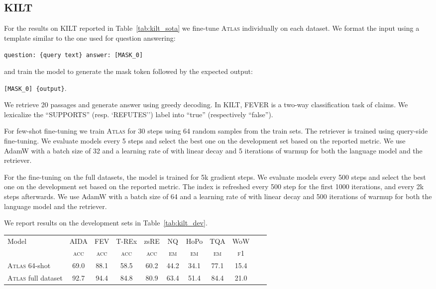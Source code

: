 \documentclass[10pt]{article} \usepackage[preprint]{tmlr}
\newcommand{\Atlas}{\textsc{Atlas}}
\begin{document}
\subsection{KILT}
\label{app:kilt}
For the results on KILT reported in Table~\ref{tab:kilt_sota} we fine-tune \Atlas{} individually on each dataset.
We format the input using a template similar to the one used for question answering:

\texttt{question: \{query text\} answer: [MASK\_0]}

and train the model to generate the mask token followed by the expected output:

\texttt{[MASK\_0] \{output\}}.

We retrieve 20 passages and generate answer using greedy decoding.
In KILT, FEVER is a two-way classification task of claims.
We lexicalize the ``SUPPORTS'' (resp. `REFUTES'') label into ``true'' (respectively ``false'').

For few-shot fine-tuning we train \Atlas{} for 30 steps using 64 random samples from the train sets.
The retriever is trained using query-side fine-tuning.
We evaluate models every 5 steps and select the best one on the development set based on the reported metric.
We use AdamW with a batch size of 32 and a learning rate of  with linear decay and 5 iterations of warmup for both the language model and the retriever.

For the fine-tuning on the full datasets, the model is trained for 5k gradient steps.
We evaluate models every 500 steps and select the best one on the development set based on the reported metric.
The index is refreshed every 500 step for the first 1000 iterations, and every 2k steps afterwards.
We use AdamW with a batch size of 64 and a learning rate of  with linear decay and 500 iterations of warmup for both the language model and the retriever.

We report results on the development sets in Table~\ref{tab:kilt_dev}.


\begin{table*}
    \centering
    \setlength{\tabcolsep}{4pt}
    \begin{tabular}{lcccccccccc}
    \toprule
    \multirow{2}{*}{Model}         & {AIDA} & {FEV} & {T-REx} & {zsRE} & {NQ} & {HoPo} & {TQA} & {WoW}  \\
    & {\textsc{acc}} & {\textsc{acc}} & {\textsc{acc}} & {\textsc{acc}} & {\textsc{em}}   & {\textsc{em}}   & {\textsc{em}} & {\textsc{f1}}   \\ \midrule
    \Atlas{} 64-shot  & 69.0 & 88.1 & 58.5 & 60.2 & 44.2 & 34.1 & 77.1 & 15.4 \\
    \Atlas{} full dataset & 92.7 & 94.4 & 84.8 & 80.9 & 63.4 & 51.4 & 84.4 & 21.0 \\
    \bottomrule
    \end{tabular}
    \caption{\textbf{Downstream results on KILT dev sets.}}
    \label{tab:kilt_dev}
\end{table*}
\end{document}
